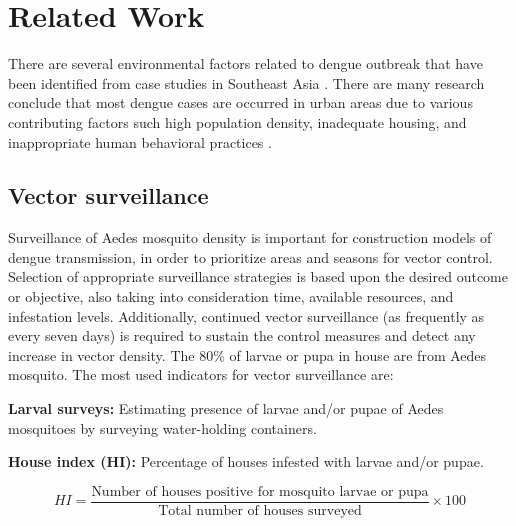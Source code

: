 \documentclass[review]{elsarticle}
\begin{document}



\section{Related Work}
%
%

There are several  environmental factors related to dengue outbreak that have been identified from case studies in Southeast Asia \cite{sulaiman1996relationship,thammapalo2008environmental,sarfraz2014near,nakhapakorn2005information}. There are many research  conclude that most dengue cases are occurred in urban areas due to various contributing factors such high population density, inadequate housing, and inappropriate human behavioral practices \cite{chang2009combining,knudsen1992vector,troyo2009urban}. 

\subsection{Vector surveillance}

Surveillance of Aedes mosquito density is important for construction models of dengue transmission, in order to prioritize areas and seasons for vector control. Selection of appropriate surveillance strategies is based upon the desired outcome or objective, also taking into consideration time, available resources, and infestation levels. Additionally, continued vector surveillance (as frequently as every seven days) is required to sustain the control measures and detect any increase in vector density. The 80\% of larvae or pupa in house are from Aedes mosquito. The most used indicators for vector surveillance are:

\textbf{Larval surveys:} Estimating presence of larvae and/or pupae of Aedes mosquitoes by surveying water-holding containers.

\textbf{House index (HI):} Percentage of houses infested with larvae and/or pupae.

\begin{equation}
\label{eq:hi}
HI =  \frac{\textrm{Number of houses positive for mosquito larvae or pupa}}{\textrm{Total number of houses surveyed}}  \times 100 
\end{equation}
\end{document}
